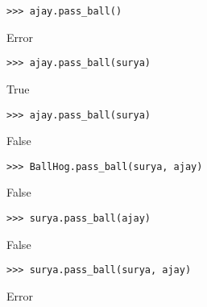 \begin{blocksection}
\begin{lstlisting}
>>> ajay.pass_ball()
\end{lstlisting}
\begin{solution}[.2in]
Error
\end{solution}

\begin{lstlisting}
>>> ajay.pass_ball(surya)
\end{lstlisting}
\begin{solution}[.2in]
True
\end{solution}

\begin{lstlisting}
>>> ajay.pass_ball(surya)
\end{lstlisting}
\begin{solution}[.2in]
False
\end{solution}

\begin{lstlisting}
>>> BallHog.pass_ball(surya, ajay)
\end{lstlisting}
\begin{solution}[.2in]
False
\end{solution}

\begin{lstlisting}
>>> surya.pass_ball(ajay)
\end{lstlisting}
\begin{solution}[.2in]
False
\end{solution}

\begin{lstlisting}
>>> surya.pass_ball(surya, ajay)
\end{lstlisting}
\begin{solution}[.2in]
Error
\end{solution}
\end{blocksection}
